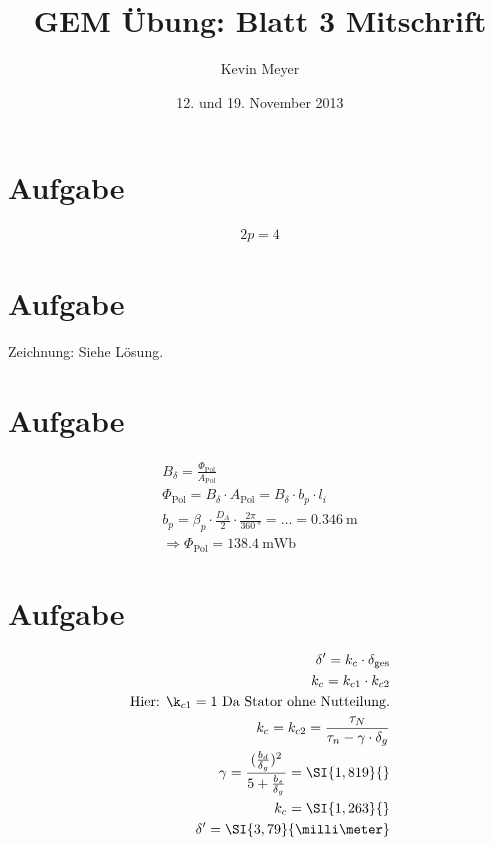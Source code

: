 \documentclass[10pt,a4paper]{article}
\begin{document}
\title{GEM Übung: \textbf{Blatt 3} Mitschrift}
\date{12. und 19. November 2013}
\author{Kevin Meyer}
\maketitle


\section{Aufgabe}
\begin{align*}
2p = 4
\end{align*}

\section{Aufgabe}
Zeichnung: Siehe Lösung.

\section{Aufgabe}
\begin{align*}
B_\delta = \frac{\Phi_\text{Pol}}{A_\text{Pol}}\\
\Phi_\text{Pol}= B_\delta \cdot A_\text{Pol} = B_\delta \cdot b_p \cdot l_i\\
b_p = \beta_p \cdot\frac{D_A}{2} \cdot \frac{2\pi}{\SI{360}{\degree}} = \ldots = \SI{0.346}{\meter}\\
\Rightarrow\Phi_\text{Pol} = \SI{138.4}{\milli\weber}
\end{align*}

\section{Aufgabe}
\begin{align*}
\delta' = k_c \cdot \delta_\text{ges}\\
k_c = k_{c1}\cdot k_{c2} \\
\text{Hier: }\k_{c1} = 1 \text{ Da Stator ohne Nutteilung.}\\
k_c = k_{c2} = \frac{\tau_N}{\tau_n - \gamma\cdot\delta_g}\\
\gamma = \frac{(\frac{b_d}{\delta_g})^2}{5+\frac{b_s}{\delta_g}} = \SI{1,819}{}\\
k_c = \SI{1,263}{}\\
\delta' = \SI{3,79}{\milli\meter}
\end{align*}
\end{document}
